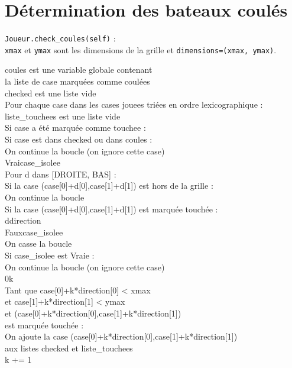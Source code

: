 \section{Détermination des bateaux coulés}\label{check_coules}
\texttt{Joueur.check\_coules(self)} :\\
\texttt{xmax} et \texttt{ymax} sont les dimensions de la grille et \texttt{dimensions=(xmax, ymax)}.
\begin{algo1}
coules est une variable globale contenant\\
la liste de case marquées comme coulées\\
checked est une liste vide\\
Pour chaque case dans les cases jouees triées en ordre lexicographique :\\
liste\_touchees est une liste vide\\
Si case a été marquée comme touchee :\\
Si case est dans checked ou dans coules :\\
On continue la boucle (on ignore cette case)\\
Vrai\sto case\_isolee\\
Pour d dans [DROITE, BAS] :\\
Si la case (case[0]+d[0],case[1]+d[1]) est hors de la grille :\\
On continue la boucle\\
Si la case (case[0]+d[0],case[1]+d[1]) est marquée touchée :\\
d\sto direction\\
Faux\sto case\_isolee\\
On casse la boucle\\
Si case\_isolee est Vraie :\\
On continue la boucle (on ignore cette case)\\
0\sto k\\
Tant que case[0]+k*direction[0] < xmax\\
et case[1]+k*direction[1] < ymax\\
et (case[0]+k*direction[0],case[1]+k*direction[1])\\
 est marquée touchée :\\
On ajoute la case (case[0]+k*direction[0],case[1]+k*direction[1])\\
aux listes checked et liste\_touchees\\
k += 1\\

\end{algo1}
